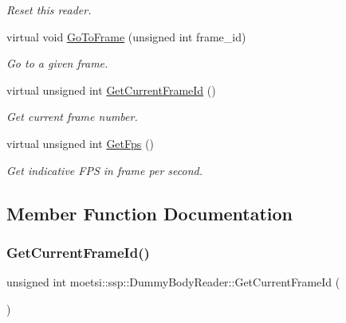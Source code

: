 \begin{DoxyCompactItemize}
\begin{DoxyCompactList}\small\item\em Reset this reader. \end{DoxyCompactList}\item 
virtual void \hyperlink{classmoetsi_1_1ssp_1_1DummyBodyReader_a61e495deb7314560d5e17388f6b6938f}{Go\+To\+Frame} (unsigned int frame\+\_\+id)
\begin{DoxyCompactList}\small\item\em Go to a given frame. \end{DoxyCompactList}\item 
virtual unsigned int \hyperlink{classmoetsi_1_1ssp_1_1DummyBodyReader_a91d5b81c241103ffde276d354a34d7db}{Get\+Current\+Frame\+Id} ()
\begin{DoxyCompactList}\small\item\em Get current frame number. \end{DoxyCompactList}\item 
virtual unsigned int \hyperlink{classmoetsi_1_1ssp_1_1DummyBodyReader_a7dab48cb8ec247add0c57d98e6cd5fb4}{Get\+Fps} ()
\begin{DoxyCompactList}\small\item\em Get indicative F\+PS in frame per second. \end{DoxyCompactList}\end{DoxyCompactItemize}


\subsection{Member Function Documentation}
\mbox{\label{classmoetsi_1_1ssp_1_1DummyBodyReader_a91d5b81c241103ffde276d354a34d7db}} 
\subsubsection{\texorpdfstring{Get\+Current\+Frame\+Id()}{GetCurrentFrameId()}}
{\footnotesize\ttfamily unsigned int moetsi\+::ssp\+::\+Dummy\+Body\+Reader\+::\+Get\+Current\+Frame\+Id (\begin{DoxyParamCaption}{ }\end{DoxyParamCaption})\hspace{0.3cm}{\ttfamily [virtual]}}



